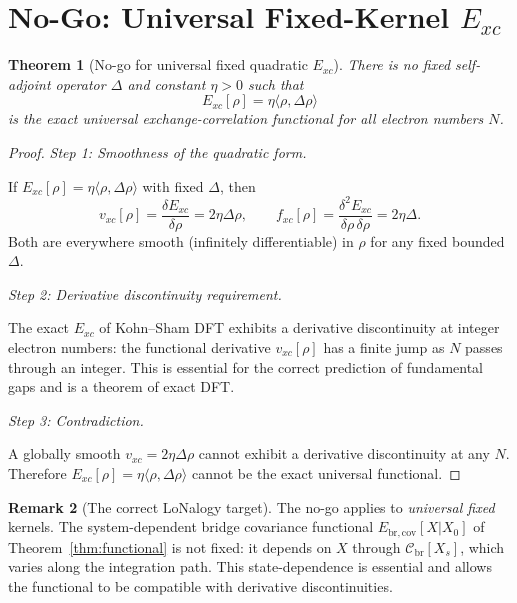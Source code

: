 \documentclass[12pt]{article}
\theoremstyle{plain}
\newtheorem{theorem}{Theorem}[section]
\theoremstyle{definition}
\newtheorem{remark}[theorem]{Remark}
\numberwithin{equation}{section}
\newcommand{\br}{\mathrm{br}}
\begin{document}
\section{No-Go: Universal Fixed-Kernel $E_{xc}$}\label{sec:nogo_Exc}

\begin{theorem}[No-go for universal fixed quadratic $E_{xc}$]\label{thm:nogo_Exc}
There is no fixed self-adjoint operator $\Delta$ and constant
$\eta>0$ such that
\begin{equation}
E_{xc}[\rho] = \eta\langle\rho,\Delta\rho\rangle
\end{equation}
is the exact universal exchange-correlation functional for all
electron numbers $N$.
\end{theorem}

\begin{proof}
\emph{Step 1: Smoothness of the quadratic form.}

If $E_{xc}[\rho]=\eta\langle\rho,\Delta\rho\rangle$ with fixed
$\Delta$, then
\begin{equation}
v_{xc}[\rho]=\frac{\delta E_{xc}}{\delta\rho}=2\eta\Delta\rho,
\qquad
f_{xc}[\rho]=\frac{\delta^2 E_{xc}}{\delta\rho\,\delta\rho}
=2\eta\Delta.
\end{equation}
Both are everywhere smooth (infinitely differentiable) in $\rho$
for any fixed bounded $\Delta$.

\emph{Step 2: Derivative discontinuity requirement.}

The exact $E_{xc}$ of Kohn--Sham DFT exhibits a derivative
discontinuity at integer electron numbers: the functional
derivative $v_{xc}[\rho]$ has a finite jump as $N$ passes through
an integer.  This is essential for the correct prediction of
fundamental gaps and is a theorem of exact DFT.

\emph{Step 3: Contradiction.}

A globally smooth $v_{xc}=2\eta\Delta\rho$ cannot exhibit a
derivative discontinuity at any $N$.  Therefore
$E_{xc}[\rho]=\eta\langle\rho,\Delta\rho\rangle$ cannot be the
exact universal functional.
\end{proof}

\begin{remark}[The correct LoNalogy target]
The no-go applies to \emph{universal fixed} kernels.  The
system-dependent bridge covariance functional
$E_{\br,\mathrm{cov}}[X|X_0]$ of Theorem~\ref{thm:functional}
is not fixed: it depends on $X$ through
$\mathcal{C}_{\br}[X_s]$, which varies along the integration
path.  This state-dependence is essential and allows the
functional to be compatible with derivative discontinuities.
\end{remark}
\end{document}
